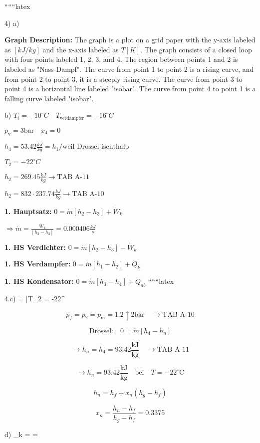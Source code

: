 
``````latex


4) a)

\textbf{Graph Description:} The graph is a plot on a grid paper with the y-axis labeled as $[kJ/kg]$ and the x-axis labeled as $T[K]$. The graph consists of a closed loop with four points labeled 1, 2, 3, and 4. The region between points 1 and 2 is labeled as "Nass-Dampf". The curve from point 1 to point 2 is a rising curve, and from point 2 to point 3, it is a steeply rising curve. The curve from point 3 to point 4 is a horizontal line labeled "isobar". The curve from point 4 to point 1 is a falling curve labeled "isobar".

b) $T_i = -10^\circ C \quad T_{\text{verdampfer}} = -16^\circ C$

$p_{\text{v}} = 3 \text{bar} \quad x_4 = 0$

$h_4 = 53.42 \frac{kJ}{kg} = h_1 / \text{weil Drossel isenthalp}$

$T_2 = -22^\circ C$

$h_2 = 269.45 \frac{kJ}{kg} \rightarrow \text{TAB A-11}$

$h_2 = 832 \cdot 237.74 \frac{kJ}{kg} \rightarrow \text{TAB A-10}$

\textbf{1. Hauptsatz:} $0 = \dot{m} [h_2 - h_3] + \dot{W}_k$

$\Rightarrow \dot{m} = \frac{\dot{W}_k}{[h_3 - h_2]} = 0.000406 \frac{kJ}{s}$

\textbf{1. HS Verdichter:} $0 = \dot{m} [h_2 - h_3] - \dot{W}_k$

\textbf{1. HS Verdampfer:} $0 = \dot{m} [h_1 - h_2] + \dot{Q}_k$

\textbf{1. HS Kondensator:} $0 = \dot{m} [h_3 - h_4] + \dot{Q}_{ab}$
``````latex


4.c) \quad {} =  \quad \bar{T}_2 = -22^\circ {}

\[
p_f = p_2 = p_{\text{m}} = 1.2 \uparrow 2 \text{bar} \quad \rightarrow \text{TAB A-10}
\]

\[
\text{Drossel:} \quad 0 = \dot{m} [h_4 - h_n]
\]

\[
\rightarrow h_n = h_4 = 93.42 \frac{\text{kJ}}{\text{kg}} \quad \rightarrow \text{TAB A-11}
\]

\[
\rightarrow h_n = 93.42 \frac{\text{kJ}}{\text{kg}} \quad \text{bei} \quad T = -22^\circ \text{C}
\]

\[
h_n = h_f + x_n (h_g - h_f)
\]

\[
x_n = \frac{h_n - h_f}{h_g - h_f} = 0.3375
\]

d) \quad \varepsilon_k =  = 


